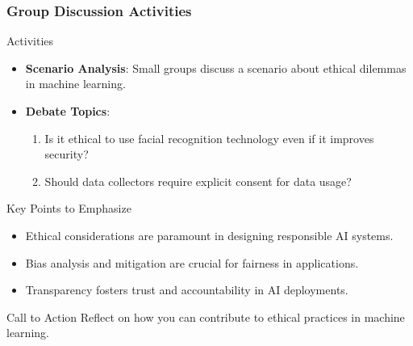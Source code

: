 \documentclass[aspectratio=169]{beamer}
\begin{document}
\begin{frame}[fragile]
    \frametitle{Group Discussion Activities}
    \begin{block}{Activities}
        \begin{itemize}
            \item \textbf{Scenario Analysis}: Small groups discuss a scenario about ethical dilemmas in machine learning.
            \item \textbf{Debate Topics}: 
                \begin{enumerate}
                    \item Is it ethical to use facial recognition technology even if it improves security?
                    \item Should data collectors require explicit consent for data usage?
                \end{enumerate}
        \end{itemize}
    \end{block}

    \begin{block}{Key Points to Emphasize}
        \begin{itemize}
            \item Ethical considerations are paramount in designing responsible AI systems.
            \item Bias analysis and mitigation are crucial for fairness in applications.
            \item Transparency fosters trust and accountability in AI deployments.
        \end{itemize}
    \end{block}

    \begin{block}{Call to Action}
        Reflect on how you can contribute to ethical practices in machine learning.
    \end{block}
\end{frame}
\end{document}
